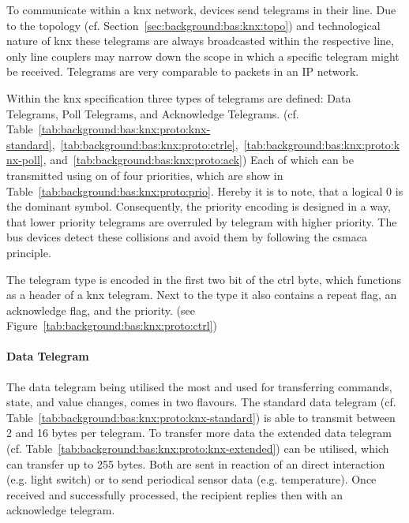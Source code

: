 To communicate within a \gls{knx} network, devices send telegrams in their line. Due to the topology (cf. Section~\ref{sec:background:bas:knx:topo}) and technological nature of \gls{knx} these telegrams are always broadcasted within the respective line, only line couplers may narrow down the scope in which a specific telegram might be received. Telegrams are very comparable to packets in an IP network.

Within the \gls{knx} specification three types of telegrams are defined: Data Telegrams, Poll Telegrams, and Acknowledge Telegrams. (cf. Table~\ref{tab:background:bas:knx:proto:knx-standard},~\ref{tab:background:bas:knx:proto:ctrle},~\ref{tab:background:bas:knx:proto:knx-poll}, and~\ref{tab:background:bas:knx:proto:ack})
Each of which can be transmitted using on of four priorities, which are show in Table~\ref{tab:background:bas:knx:proto:prio}. Hereby it is to note, that a logical 0 is the dominant symbol. Consequently, the priority encoding is designed in a way, that lower priority telegrams are overruled by telegram with higher priority.
The bus devices detect these collisions and avoid them by following the \gls{csmaca} principle.

The telegram type is encoded in the first two bit of the \gls{ctrl} byte, which functions as a header of a \gls{knx} telegram. Next to the type it also contains a repeat flag, an acknowledge flag, and the priority. (see Figure~\ref{tab:background:bas:knx:proto:ctrl})



\paragraph{Data Telegram}
\label{sec:background:bas:knx:proto:data}

The data telegram being utilised the most and used for transferring commands, state, and value changes, comes in two flavours.
The standard data telegram (cf. Table~\ref{tab:background:bas:knx:proto:knx-standard}) is able to transmit between 2 and 16 bytes per telegram. To transfer more data the extended data telegram (cf. Table~\ref{tab:background:bas:knx:proto:knx-extended}) can be utilised, which can transfer up to 255 bytes.
Both are sent in reaction of an direct interaction (e.g. light switch) or to send periodical sensor data (e.g. temperature). \parencite{Merz2009}
Once received and successfully processed, the recipient replies then with an acknowledge telegram. \parencite{Merz2009,Sokollik2017}

